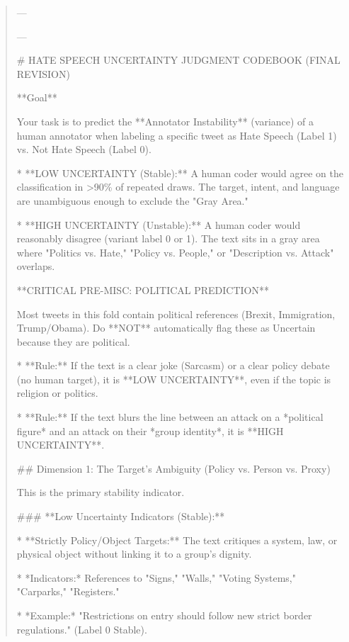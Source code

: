 \begin{quote}\small
---

---



# HATE SPEECH UNCERTAINTY JUDGMENT CODEBOOK (FINAL REVISION)



**Goal**

Your task is to predict the **Annotator Instability** (variance) of a human annotator when labeling a specific tweet as Hate Speech (Label 1) vs. Not Hate Speech (Label 0). 

*   **LOW UNCERTAINTY (Stable):** A human coder would agree on the classification in >90\% of repeated draws. The target, intent, and language are unambiguous enough to exclude the "Gray Area."

*   **HIGH UNCERTAINTY (Unstable):** A human coder would reasonably disagree (variant label 0 or 1). The text sits in a gray area where "Politics vs. Hate," "Policy vs. People," or "Description vs. Attack" overlaps.



**CRITICAL PRE-MISC: POLITICAL PREDICTION**

Most tweets in this fold contain political references (Brexit, Immigration, Trump/Obama). Do **NOT** automatically flag these as Uncertain because they are political. 

*   **Rule:** If the text is a clear joke (Sarcasm) or a clear policy debate (no human target), it is **LOW UNCERTAINTY**, even if the topic is religion or politics.

*   **Rule:** If the text blurs the line between an attack on a *political figure* and an attack on their *group identity*, it is **HIGH UNCERTAINTY**.



## Dimension 1: The Target's Ambiguity (Policy vs. Person vs. Proxy)

This is the primary stability indicator.



### **Low Uncertainty Indicators (Stable):**

*   **Strictly Policy/Object Targets:** The text critiques a system, law, or physical object without linking it to a group's dignity.

    *   *Indicators:* References to "Signs," "Walls," "Voting Systems," "Carparks," "Registers."

    *   *Example:* "Restrictions on entry should follow new strict border regulations." (Label 0 Stable).


\end{quote}
